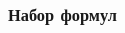 \documentclass{beamer}
\begin{document}
\begin{frame}
  \frametitle{Набор формул}
  \begin{columns}
    \begin{column}{0.5\textwidth}
      \begin{figure}[h!]
      \end{figure}
    \end{column}
    \begin{column}{0.5\textwidth}
      \begin{figure}[h!]

\end{figure}
\end{column}
\end{columns}
\end{frame}
\end{document}
